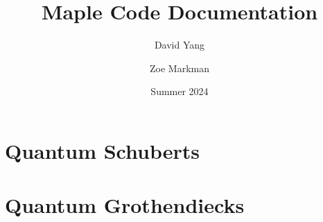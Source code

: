 \documentclass[11pt]{article}
\begin{document}
\title{\textbf{Maple Code Documentation}}
\author{David Yang \and Zoe Markman}
\date{Summer 2024}

\maketitle

\section{Quantum Schuberts}

\section{Quantum Grothendiecks}
\end{document}

